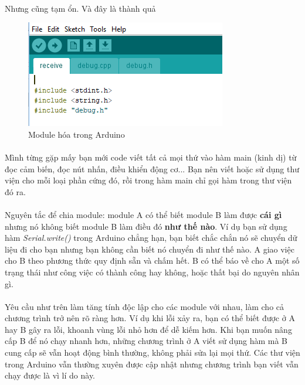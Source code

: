 \documentclass[12pt,a5paper]{book}
\begin{document}
\paragraph{}
Nhưng cũng tạm ổn. Và đây là thành quả
\begin{figure}[h!]
\centering
 \includegraphics[width=0.8\linewidth]{arduino.png}
 \caption{Module hóa trong Arduino}
\end{figure}
\paragraph{}
Mình từng gặp mấy bạn mới code viết tất cả mọi thứ vào hàm main (kinh dị) từ đọc cảm biến, đọc nút nhấn, điều khiển động cơ... Bạn nên viết hoặc sử dụng thư viện cho mỗi loại phần cứng đó, rồi trong hàm main chỉ gọi hàm trong thư viện đó ra.
\paragraph{}
Nguyên tắc để chia module: module A có thể biết module B làm được \textbf{cái gì} nhưng nó không biết module B làm điều đó \textbf{như thế nào}. Ví dụ bạn sử dụng hàm \textit{Serial.write()} trong Arduino chẳng hạn, bạn biết chắc chắn nó sẽ chuyển dữ liệu đi cho bạn nhưng bạn không cần biết nó chuyển đi như thế nào. A giao việc cho B theo phương thức quy định sẵn và chấm hết. B có thể báo về cho A một số trạng thái như công việc có thành công hay không, hoặc thất bại do nguyên nhân gì.
\paragraph{}
Yêu cầu như trên làm tăng tính độc lập cho các module với nhau, làm cho cả chương trình trở nên rõ ràng hơn. Ví dụ khi lỗi xảy ra, bạn có thể biết được ở A hay B gây ra lỗi, khoanh vùng lỗi nhỏ hơn để dễ kiếm hơn. Khi bạn muốn nâng cấp B để nó chạy nhanh hơn, những chương trình ở A viết sử dụng hàm mà B cung cấp sẽ vẫn hoạt động bình thường, không phải sửa lại mọi thứ. Các thư viện trong Arduino vẫn thường xuyên được cập nhật nhưng chương trình bạn viết vẫn chạy được là vì lí do này.
\end{document}

